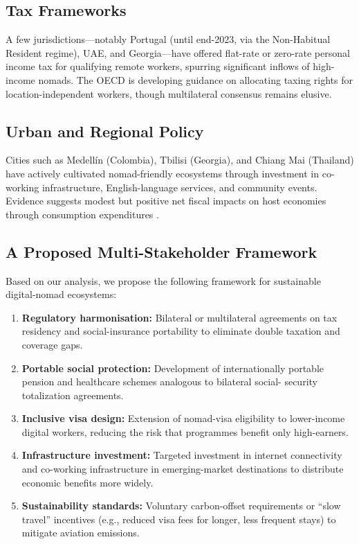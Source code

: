 \documentclass[12pt,a4paper]{article}
\begin{document}
\subsection{Tax Frameworks}

A few jurisdictions—notably Portugal (until end-2023, via the Non-Habitual
Resident regime), UAE, and Georgia—have offered flat-rate or zero-rate personal
income tax for qualifying remote workers, spurring significant inflows of high-
income nomads. The OECD is developing guidance on allocating taxing rights for
location-independent workers, though multilateral consensus remains elusive.

\subsection{Urban and Regional Policy}

Cities such as Medellín (Colombia), Tbilisi (Georgia), and Chiang Mai
(Thailand) have actively cultivated nomad-friendly ecosystems through
investment in co-working infrastructure, English-language services, and
community events. Evidence suggests modest but positive net fiscal impacts on
host economies through consumption expenditures
\citep{Hannonen2020}.

\subsection{A Proposed Multi-Stakeholder Framework}

Based on our analysis, we propose the following framework for sustainable
digital-nomad ecosystems:

\begin{enumerate}
  \item \textbf{Regulatory harmonisation:} Bilateral or multilateral agreements
        on tax residency and social-insurance portability to eliminate double
        taxation and coverage gaps.

  \item \textbf{Portable social protection:} Development of internationally
        portable pension and healthcare schemes analogous to bilateral social-
        security totalization agreements.

  \item \textbf{Inclusive visa design:} Extension of nomad-visa eligibility to
        lower-income digital workers, reducing the risk that programmes benefit
        only high-earners.

  \item \textbf{Infrastructure investment:} Targeted investment in internet
        connectivity and co-working infrastructure in emerging-market
        destinations to distribute economic benefits more widely.

  \item \textbf{Sustainability standards:} Voluntary carbon-offset requirements
        or ``slow travel'' incentives (e.g., reduced visa fees for longer, less
        frequent stays) to mitigate aviation emissions.
\end{enumerate}
\end{document}
